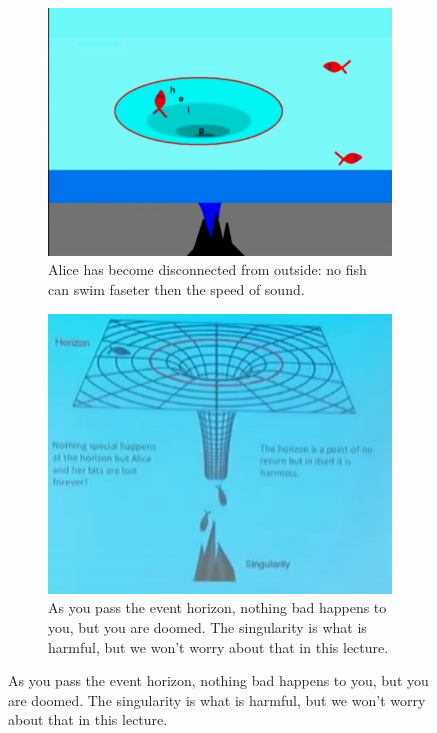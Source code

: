 \documentclass[]{article}
\begin{document}
\begin{figure}[H]
	\caption{William Unruh's analogy for a black hole}
	\begin{subfigure}[t]{0.45\textwidth}
		\caption{Alice has become disconnected from outside: no fish can swim faseter then the speed of sound.}
		\includegraphics[width=\textwidth]{wh-alice}
	\end{subfigure}
	\begin{subfigure}[t]{0.45\textwidth}
		\caption{As you pass the event horizon, nothing bad happens to you, but you are doomed. The singularity is what is harmful, but we won't worry about that in this lecture.}
		\includegraphics[width=\textwidth]{wh-black-hole}
	\end{subfigure}
\end{figure} 
\end{document}
